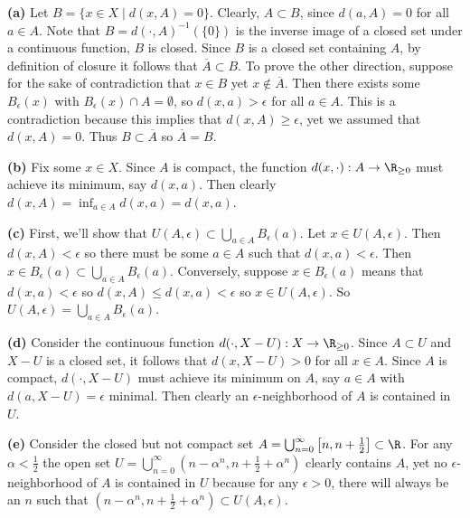 \documentclass[11pt,letterpaper]{article}
\begin{document}
\begin{solution}
    \textbf{(a)} Let $B=\{x\in X \mid d(x, A)=0\}$. Clearly, $A\subset B$, since $d(a,A)=0$ for all $a\in A$. Note that $B=d(\cdot,A)^{-1}(\{0\})$ is the inverse image of a closed set under a continuous function, $B$ is closed. Since $B$ is a closed set containing $A$, by definition of closure it follows that $\overline{A}\subset B$. To prove the other direction, suppose for the sake of contradiction that $x\in B$ yet $x\not\in \overline{A}$. Then there exists some $B_\epsilon(x)$ with $B_\epsilon(x)\cap A=\emptyset$, so $d(x,a)>\epsilon$ for all $a\in A$. This is a contradiction because this implies that $d(x,A)\geq \epsilon$, yet we assumed that $d(x,A)=0$. Thus $B\subset \overline{A}$ so $\overline{A}=B$.   
    
    \textbf{(b)} Fix some $x\in X$. Since $A$ is compact, the function $d(x,\cdot) : A \to \R_{\geq 0}$ must achieve its minimum, say $d(x,a)$. Then clearly $d(x,A)=\inf_{a\in A}d(x,a)=d(x,a)$.
    
    \textbf{(c)} First, we'll show that $U(A,\epsilon)\subset \bigcup_{a\in A}B_\epsilon(a)$. Let $x\in U(A,\epsilon)$. Then $d(x,A)<\epsilon$ so there must be some $a\in A$ such that $d(x,a)<\epsilon$. Then $x\in B_\epsilon(a)\subset \bigcup_{a\in A}B_\epsilon(a)$. Conversely, suppose $x\in B_\epsilon(a)$ means that $d(x,a)<\epsilon$ so $d(x,A)\leq d(x,a)<\epsilon$ so $x\in U(A,\epsilon)$. So $U(A, \epsilon)=\bigcup_{a\in A}B_\epsilon(a)$. 
    
    \textbf{(d)} Consider the continuous function $d(\cdot, X-U) : X \to \R_{\geq 0}$. Since $A\subset U$ and $X-U$ is a closed set, it follows that $d(x,X-U)>0$ for all $x\in A$. Since $A$ is compact, $d(\cdot, X-U)$ must achieve its minimum on $A$, say $a\in A$ with $d(a, X-U)=\epsilon$ minimal. Then clearly an $\epsilon$-neighborhood of $A$ is contained in $U$.
    
    \textbf{(e)} Consider the closed but not compact set $A=\bigcup^\infty_{n=0}\left[n, n+\frac{1}{2}\right]\subset \R$. For any $\alpha < \frac{1}{2}$ the open set $U = \bigcup^\infty_{n=0}\left(n-\alpha^n, n+\frac{1}{2}+\alpha^n\right)$ clearly contains $A$, yet no $\epsilon$-neighborhood of $A$ is contained in $U$ because for any $\epsilon>0$, there will always be an $n$ such that $\left(n-\alpha^n, n+\frac{1}{2}+\alpha^n\right)\subset U(A,\epsilon)$.  
\end{solution}
\end{document}

